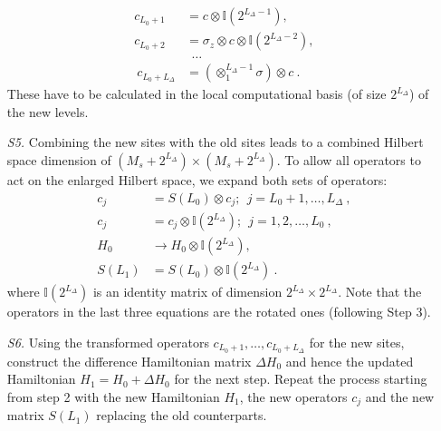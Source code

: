\documentclass[reprint]{revtex4-2}
\begin{document}
\begin{itemize}
\begin{equation}
\begin{aligned}
			c_{L_0+1} &= c \otimes \mathbb{I}(2^{L_\Delta - 1}),\\
			c_{L_0+2} &= \sigma_z \otimes c \otimes \mathbb{I}(2^{L_\Delta - 2}),\\
					   &~~ \ldots~\\
			~c_{L_0+L_\Delta} &= (\otimes_1^{L_\Delta-1} \sigma) \otimes c ~.
		\end{aligned}\end{equation}
		These have to be calculated in the local computational basis (of size \(2^{L_\Delta}\)) of the new levels. 
	\item[{\it S5.}] Combining the new sites with the old sites leads to a combined Hilbert space dimension of \((M_s + 2^{L_\Delta}) \times (M_s + 2^{L_\Delta})\). To allow all operators to act on the enlarged Hilbert space, we expand both sets of operators:
	\begin{equation}\begin{aligned}
		c_j &= S(L_0) \otimes c_j;~~j=L_0 +1, \ldots, L_\Delta~,\\
		c_j &= c_j \otimes \mathbb{I}(2^{L_\Delta});~ ~ j=1, 2, \ldots, L_0~,\\
		H_0 &\to H_0 \otimes \mathbb{I}(2^{L_\Delta}),\\
		S(L_1) &= S(L_0) \otimes \mathbb{I}(2^{L_\Delta})~.
	\end{aligned}\end{equation}
	where \(\mathbb{I}(2^{L_\Delta})\) is an identity matrix of dimension \(2^{L_\Delta} \times 2^{L_\Delta}\). Note that the operators in the last three equations are the rotated ones (following Step 3).
\item[{\it S6.}] Using the transformed operators \(c_{L_0+1},\ldots,c_{L_0 + L_\Delta}\) for the new sites, construct the difference Hamiltonian matrix \(\Delta H_0\) and hence the updated Hamiltonian \(H_1 = H_0 + \Delta H_0\) for the next step. Repeat the process starting from step 2 with the new Hamiltonian \(H_1\), the new operators \(c_j\) and the new matrix \(S(L_1)\) replacing the old counterparts.
\end{itemize}
\end{document}
